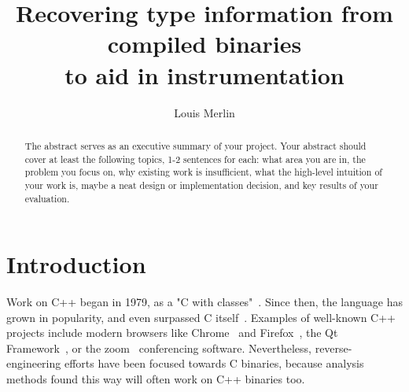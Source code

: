 \documentclass[a4paper,11pt,oneside]{report}
\title{Recovering type information from compiled binaries\\to aid in instrumentation}
\author{Louis Merlin}
\begin{document}
\maketitle
\makededication
\makeacks

\begin{abstract}
The abstract serves as an executive summary of your project.
Your abstract should cover at least the following topics, 1-2 sentences for
each: what area you are in, the problem you focus on, why existing work is
insufficient, what the high-level intuition of your work is, maybe a neat
design or implementation decision, and key results of your evaluation.
\end{abstract}


\maketoc

\chapter{Introduction}





Work on C++ began in 1979, as a "C with classes"~\cite{cwithclasses}.
Since then, the language has grown in popularity, and even surpassed C itself~\cite{stackoverflowpopularity}.
Examples of well-known C++ projects include modern browsers like Chrome~\cite{chrome} and Firefox~\cite{firefox}, the Qt Framework~\cite{qt}, or the zoom~\cite{zoom} conferencing software.
Nevertheless, reverse-engineering efforts have been focused towards C binaries, because analysis methods found this way will often work on C++ binaries too.
\end{document}

